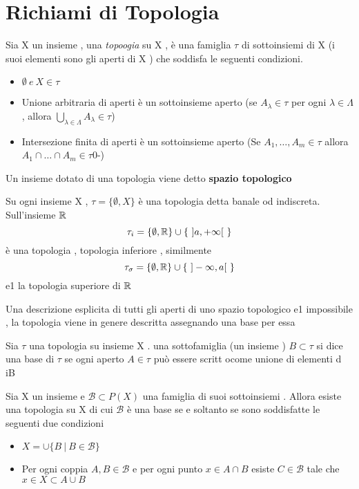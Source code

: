 %

\section{Richiami di Topologia}
\begin{definizione} Sia X un insieme , una \textit{topoogia} su X , è    una famiglia $\tau$ di sottoinsiemi di X (i suoi elementi sono gli aperti di X ) che soddisfa le seguenti condizioni. 
	\begin{itemize}
		\item $\emptyset \ e \ X \in\tau$
		\item Unione arbitraria di aperti è un sottoinsieme aperto (se $A_{\lambda} \in \tau$ per ogni $\lambda \in \Lambda$ , allora $\bigcup_{\lambda \in \Lambda} A_{\lambda} \in \tau$)
		\item Intersezione finita di  aperti è un sottoinsieme aperto  (Se $A_1 , \dots , A_m \in \tau $ allora $A_1 \cap \dots \cap A_m \in \tau$0-)
	\end{itemize}
	Un insieme dotato di una topologia viene detto \textbf{spazio topologico}
\end{definizione}
\begin{es}
	Su ogni insieme X , $\tau = \{\emptyset , X\}$ è una topologia detta banale od indiscreta. \\
	Sull'insieme $\mathbb{R}$ 
	$$\tau_i = \{\emptyset , \mathbb{R}\} \cup \{\ ]a , + \infty [ \ \}$$
	è una topologia , topologia inferiore , similmente 
		$$\tau_{\sigma} = \{\emptyset , \mathbb{R}\} \cup \{\ ]-\infty  , a [\  \}$$ e1 la topologia superiore di $\mathbb{R}$
\end{es}
Una descrizione esplicita di tutti gli aperti di uno spazio topologico e1 impossibile , la topologia viene in genere descritta assegnando una base per essa 
\begin{definizione}	
	Sia $\tau$ una topologia su insieme X . una sottofamiglia (un insieme ) $B \subset \tau$ si dice una base di $\tau$ se ogni aperto $A \in \tau$ può essere scritt ocome unione di elementi d iB 	
	\end{definizione}
	\begin{teorema}
		Sia X un insieme  e $\mathcal{B} \subset P(X)$ una famiglia di suoi sottoinsiemi . Allora esiste una topologia su X di cui $\mathcal{B}$ è una base se e soltanto se sono soddisfatte le seguenti due condizioni 
		\begin{itemize}
			\item $X = \cup \{B \ |\  B \in \mathcal{B} \}$
			\item Per ogni coppia $A,B \in \mathcal{B}$ e per ogni punto $x \in A \cap B $ esiste $C \in \mathcal{B}$ tale che $x \in X \subset A \cup B$
		\end{itemize}
			\end{teorema}

